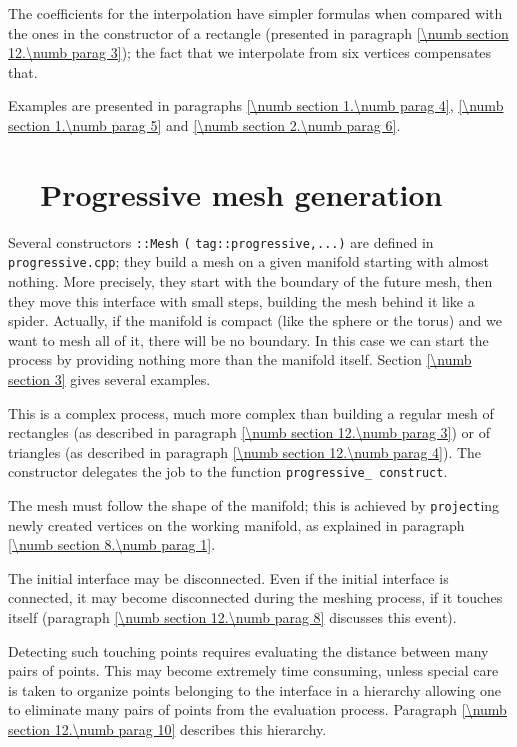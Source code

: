 The coefficients for the interpolation have simpler formulas when compared with the ones in the
constructor of a rectangle (presented in paragraph \ref{\numb section 12.\numb parag 3});
the fact that we interpolate from six vertices compensates that.

Examples are presented in paragraphs \ref{\numb section 1.\numb parag 4},
\ref{\numb section 1.\numb parag 5} and \ref{\numb section 2.\numb parag 6}.


\section{~~Progressive mesh generation}\label{\numb section 12.\numb parag 5}

Several constructors {\small\tt {}::Mesh} {\small\tt(}
{\small\tt\textcolor{tag}{tag}::progressive,...)} are defined in {\small\tt progressive.cpp};
they build a mesh on a given manifold starting with almost nothing.
More precisely, they start with the boundary of the future mesh, then they
move this interface with small steps, building the mesh behind it like a spider.
Actually, if the manifold is compact (like the sphere or the torus) and we want to mesh
all of it, there will be no boundary.
In this case we can start the process by providing nothing more than the manifold itself.
Section \ref{\numb section 3} gives several examples.

This is a complex process, much more complex than building a regular mesh of rectangles
(as described in paragraph \ref{\numb section 12.\numb parag 3}) or of triangles (as described
in paragraph \ref{\numb section 12.\numb parag 4}).
The constructor delegates the job to the function {\small\tt progressive\_\,construct}.

The mesh must follow the shape of the manifold; this is achieved by {\small\tt project}ing
newly created vertices on the working manifold, as explained in paragraph
\ref{\numb section 8.\numb parag 1}.

The initial interface may be disconnected.
Even if the initial interface is connected, it may become disconnected during the meshing
process, if it touches itself (paragraph \ref{\numb section 12.\numb parag 8}
discusses this event).

Detecting such touching points requires evaluating the distance between many pairs of points.
This may become extremely time consuming, unless special care is taken to organize points
belonging to the interface in a hierarchy allowing one to eliminate many pairs of points
from the evaluation process.
Paragraph \ref{\numb section 12.\numb parag 10} describes this hierarchy.

